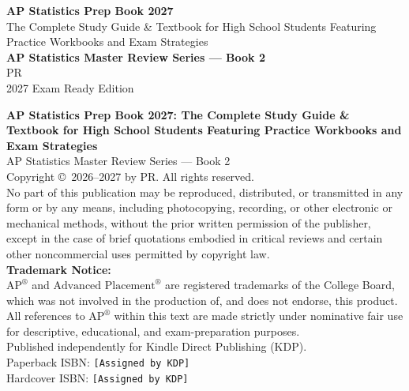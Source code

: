 ﻿\documentclass[11pt,oneside,openany]{book}
\newcommand{\BookTitle}{AP Statistics Prep Book 2027}
\newcommand{\BookSubtitle}{The Complete Study Guide \& Textbook for High School Students Featuring Practice Workbooks and Exam Strategies}
\newcommand{\BookSeries}{AP Statistics Master Review Series --- Book 2}
\newcommand{\BookAuthor}{PR}
\newcommand{\Edition}{2027 Exam Ready Edition}
\begin{document}
\frontmatter

\thispagestyle{empty}
\begin{center}
  \vspace*{2cm}
  {\Huge\bfseries\color{MidnightBlue} \BookTitle}\\[12pt]
  {\Large\color{DarkSlateGray} \BookSubtitle}\\[24pt]
  {\large\bfseries \BookSeries}\\[36pt]
  {\Large \BookAuthor}\\[24pt]
  {\normalsize \Edition}
\end{center}
\clearpage

\thispagestyle{empty}
\vspace*{\fill}
\begin{center}
  \begin{minipage}{0.9\linewidth}
    \small
    \textbf{\BookTitle: \BookSubtitle}\\
    \BookSeries\\[6pt]
    Copyright \copyright\ 2026--2027 by \BookAuthor. All rights reserved.\\[10pt]
    No part of this publication may be reproduced, distributed, or transmitted in any form or by any means, including photocopying, recording, or other electronic or mechanical methods, without the prior written permission of the publisher, except in the case of brief quotations embodied in critical reviews and certain other noncommercial uses permitted by copyright law.\\[10pt]
    \textbf{Trademark Notice:}\\
    $\text{AP}^\circledR$ and $\text{Advanced Placement}^\circledR$ are registered trademarks of the College Board, which was not involved in the production of, and does not endorse, this product. All references to $\text{AP}^\circledR$ within this text are made strictly under nominative fair use for descriptive, educational, and exam-preparation purposes.\\[10pt]
    Published independently for Kindle Direct Publishing (KDP).\\
    Paperback ISBN: \texttt{[Assigned by KDP]}\\
    Hardcover ISBN: \texttt{[Assigned by KDP]}\\
  \end{minipage}
\end{center}
\vspace*{\fill}
\clearpage
\end{document}
